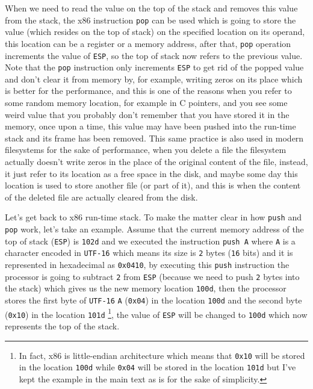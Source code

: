 When we need to read the value on the top of the stack and removes this
value from the stack, the x86 instruction \lstinline!pop! can be used
which is going to store the value (which resides on the top of stack) on
the specified location on its operand, this location can be a register
or a memory address, after that, \lstinline!pop! operation increments
the value of \lstinline!ESP!, so the top of stack now refers to the
previous value. Note that the \lstinline!pop! instruction only
increments \lstinline!ESP! to get rid of the popped value and don't
clear it from memory by, for example, writing zeros on its place which
is better for the performance, and this is one of the reasons when you
refer to some random memory location, for example in C pointers, and you
see some weird value that you probably don't remember that you have
stored it in the memory, once upon a time, this value may have been
pushed into the run-time stack and its frame has been removed. This same
practice is also used in modern filesystems for the sake of performance,
when you delete a file the filesystem actually doesn't write zeros in
the place of the original content of the file, instead, it just refer to
its location as a free space in the disk, and maybe some day this
location is used to store another file (or part of it), and this is when
the content of the deleted file are actually cleared from the disk.

Let's get back to x86 run-time stack. To make the matter clear in how
\lstinline!push! and \lstinline!pop! work, let's take an example. Assume
that the current memory address of the top of stack (\lstinline!ESP!) is
\lstinline!102d! and we executed the instruction \lstinline!push A!
where \lstinline!A! is a character encoded in \lstinline!UTF-16! which
means its size is \lstinline!2! bytes (\lstinline!16! bits) and it is
represented in hexadecimal as \lstinline!0x0410!, by executing this
\lstinline!push! instruction the processor is going to subtract
\lstinline!2! from \lstinline!ESP! (because we need to push
\lstinline!2! bytes into the stack) which gives us the new memory
location \lstinline!100d!, then the processor stores the first byte of
\lstinline!UTF-16! \lstinline!A! (\lstinline!0x04!) in the location
\lstinline!100d! and the second byte (\lstinline!0x10!) in the location
\lstinline!101d! \footnote{In fact, x86 is little-endian architecture
  which means that \lstinline!0x10! will be stored in the location
  \lstinline!100d! while \lstinline!0x04! will be stored in the location
  \lstinline!101d! but I've kept the example in the main text as is for
  the sake of simplicity.}, the value of \lstinline!ESP! will be changed
to \lstinline!100d! which now represents the top of the stack.

